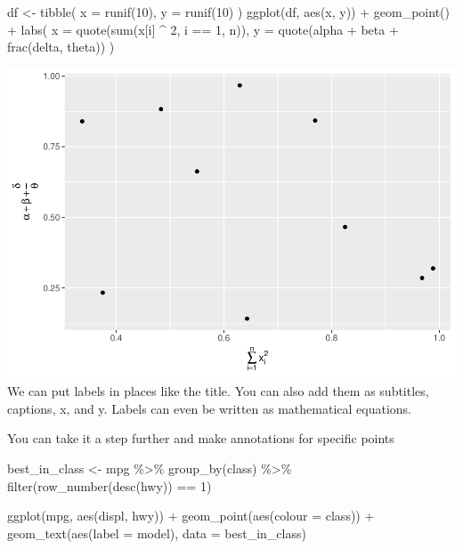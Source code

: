 \documentclass[
]{article}
\newenvironment{Shaded}{\begin{snugshade}}{\end{snugshade}}
\newcommand{\AttributeTok}[1]{\textcolor[rgb]{0.77,0.63,0.00}{#1}}
\newcommand{\DecValTok}[1]{\textcolor[rgb]{0.00,0.00,0.81}{#1}}
\newcommand{\FunctionTok}[1]{\textcolor[rgb]{0.00,0.00,0.00}{#1}}
\newcommand{\NormalTok}[1]{#1}
\newcommand{\OtherTok}[1]{\textcolor[rgb]{0.56,0.35,0.01}{#1}}
\newcommand{\SpecialCharTok}[1]{\textcolor[rgb]{0.00,0.00,0.00}{#1}}
\begin{document}
\begin{Shaded}
\begin{Highlighting}[]
\NormalTok{df }\OtherTok{\textless{}{-}} \FunctionTok{tibble}\NormalTok{(}
  \AttributeTok{x =} \FunctionTok{runif}\NormalTok{(}\DecValTok{10}\NormalTok{),}
  \AttributeTok{y =} \FunctionTok{runif}\NormalTok{(}\DecValTok{10}\NormalTok{)}
\NormalTok{)}
\FunctionTok{ggplot}\NormalTok{(df, }\FunctionTok{aes}\NormalTok{(x, y)) }\SpecialCharTok{+}
  \FunctionTok{geom\_point}\NormalTok{() }\SpecialCharTok{+}
  \FunctionTok{labs}\NormalTok{(}
    \AttributeTok{x =} \FunctionTok{quote}\NormalTok{(}\FunctionTok{sum}\NormalTok{(x[i] }\SpecialCharTok{\^{}} \DecValTok{2}\NormalTok{, i }\SpecialCharTok{==} \DecValTok{1}\NormalTok{, n)),}
    \AttributeTok{y =} \FunctionTok{quote}\NormalTok{(alpha }\SpecialCharTok{+}\NormalTok{ beta }\SpecialCharTok{+} \FunctionTok{frac}\NormalTok{(delta, theta))}
\NormalTok{  )}
\end{Highlighting}
\end{Shaded}

\includegraphics{Journal_files/figure-latex/unnamed-chunk-51-4.pdf} We
can put labels in places like the title. You can also add them as
subtitles, captions, x, and y. Labels can even be written as
mathematical equations.

You can take it a step further and make annotations for specific points

\begin{Shaded}
\begin{Highlighting}[]
\NormalTok{best\_in\_class }\OtherTok{\textless{}{-}}\NormalTok{ mpg }\SpecialCharTok{\%\textgreater{}\%}
  \FunctionTok{group\_by}\NormalTok{(class) }\SpecialCharTok{\%\textgreater{}\%}
  \FunctionTok{filter}\NormalTok{(}\FunctionTok{row\_number}\NormalTok{(}\FunctionTok{desc}\NormalTok{(hwy)) }\SpecialCharTok{==} \DecValTok{1}\NormalTok{)}

\FunctionTok{ggplot}\NormalTok{(mpg, }\FunctionTok{aes}\NormalTok{(displ, hwy)) }\SpecialCharTok{+}
  \FunctionTok{geom\_point}\NormalTok{(}\FunctionTok{aes}\NormalTok{(}\AttributeTok{colour =}\NormalTok{ class)) }\SpecialCharTok{+}
  \FunctionTok{geom\_text}\NormalTok{(}\FunctionTok{aes}\NormalTok{(}\AttributeTok{label =}\NormalTok{ model), }\AttributeTok{data =}\NormalTok{ best\_in\_class)}
\end{Highlighting}
\end{Shaded}
\end{document}
